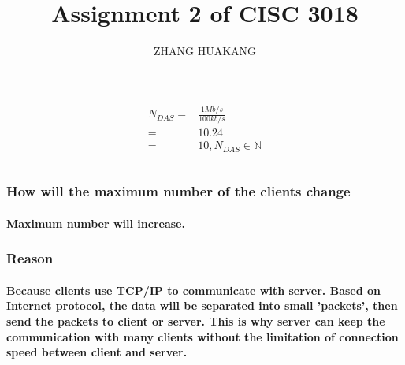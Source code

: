 \documentclass{article}
\title{Assignment 2 of CISC 3018}
\author{ZHANG HUAKANG}
\begin{document}
    \maketitle
    \section{}
        \subsection{}
            \paragraph{
                \begin{equation*}
                    \begin{split}
                        N_{DAS}=&\frac{1Mb/s}{100kb/s}\\
                            =&10.24\\
                            =&10,N_{DAS}\in \mathbb{N}\\
                    \end{split}
                \end{equation*}
            }
        \subsection{}
            \subsubsection{How will the  maximum number of the clients change }
                \paragraph{
                    Maximum number will increase.
                }
            \subsubsection{Reason}
                \paragraph{
                    Because clients use TCP/IP to communicate with server. Based on Internet protocol, the data will be separated into small 'packets', then send the packets to client or server. This is why server can keep the communication with many clients without the limitation of connection speed between client and server.
                }
\end{document}
